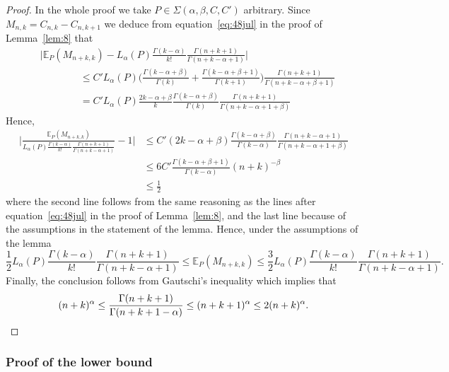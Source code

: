 \documentclass{article}
\newcommand{\1}{\boldsymbol{1}}
\newcommand{\EE}{\mathbb{E}}
\theoremstyle{plain}
\begin{document}
  \begin{proof}
    In the whole proof we take $P \in \Sigma(\alpha,\beta,C,C')$ arbitrary. Since $M_{n,k} = C_{n,k} - C_{n,k+1}$ we deduce from equation~\eqref{eq:48jul} in the proof of Lemma~\ref{lem:8} that
    \begin{align*}
      &\Big|\EE_P(M_{n+k,k}) - L_{\alpha}(P)\frac{\Gamma(k-\alpha)}{k!}\frac{\Gamma(n+k+1)}{\Gamma(n+k-\alpha+1)} \Big|\\%
      &\qquad\qquad\leq C'L_{\alpha}(P)\Bigg(\frac{\Gamma(k-\alpha+\beta)}{\Gamma(k)} + \frac{\Gamma(k-\alpha+\beta+1)}{\Gamma(k+1)} \Bigg)\frac{\Gamma(n+k+1)}{\Gamma(n+k-\alpha+\beta+1)}\\
      &\qquad\qquad= C'L_{\alpha}(P)\frac{2k-\alpha+\beta}{k}\frac{\Gamma(k-\alpha+\beta)}{\Gamma(k)}\frac{\Gamma(n+k+1)}{\Gamma(n+k-\alpha+1+\beta)}
    \end{align*}
    Hence,
    \begin{align*}
      \Bigg|\frac{\EE_P(M_{n+k,k})}{L_{\alpha}(P)\frac{\Gamma(k-\alpha)}{k!}\frac{\Gamma(n+k+1)}{\Gamma(n+k-\alpha+1)} }%
      -1 \Bigg|
      &\leq C'(2k-\alpha+\beta) \frac{\Gamma(k-\alpha+\beta)}{\Gamma(k-\alpha)}%
        \frac{\Gamma(n+k-\alpha+1)}{\Gamma(n+k-\alpha+1+\beta)}\\
      &\leq 6C'\frac{\Gamma(k-\alpha+\beta+1)}{\Gamma(k-\alpha)}(n+k)^{-\beta}\\
      &\leq \frac{1}{2}
    \end{align*}
    where the second line follows from the same reasoning as the lines after equation~\eqref{eq:48jul} in the proof of Lemma~\ref{lem:8}, and the last line because of the assumptions in the statement of the lemma. Hence, under the assumptions of the lemma
    \begin{equation*}
      \frac{1}{2}L_{\alpha}(P)\frac{\Gamma(k-\alpha)}{k!}\frac{\Gamma(n+k+1)}{\Gamma(n+k-\alpha+1)}%
      \leq \EE_P(M_{n+k,k})%
        \leq
      \frac{3}{2}L_{\alpha}(P)\frac{\Gamma(k-\alpha)}{k!}\frac{\Gamma(n+k+1)}{\Gamma(n+k-\alpha+1)}.%
    \end{equation*}
    Finally, the conclusion follows from Gautschi's inequality which implies that
    \begin{equation*}
      (n+k)^{\alpha} \leq \frac{\Gamma(n+k+1)}{\Gamma(n+k+1-\alpha)}%
      \leq
      (n+k+1)^{\alpha} \leq 2(n+k)^{\alpha}.
      \qedhere
    \end{equation*}
  \end{proof}


\subsubsection{Proof of the lower bound}
\label{sec:proof-thm:6}
\end{document}
